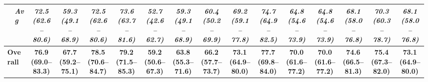 \documentclass[10pt,journal,compsoc, onecolumn]{IEEEtran}
\begin{document}
\begin{table}
\begin{tabular}{ll ccc c ccc ccc ccc c}
\cmidrule{2-16}
& \textit{Avg} & \textit{72.5 (62.6--80.6)} & \textit{59.3 (49.1--68.9)} & \textit{72.5 (62.6--80.6)} & \textit{73.6 (63.7--81.6)} & \textit{52.7 (42.6--62.7)} & \textit{59.3 (49.1--68.9)} & \textit{60.4 (50.2--69.9)} & \textit{69.2 (59.1--77.8)} & \textit{74.7 (64.9--82.5)} & \textit{64.8 (54.6--73.9)} & \textit{64.8 (54.6--73.9)} & \textit{68.1 (58.0--76.8)} & \textit{70.3 (60.3--78.7)} & \textit{68.1 (58.0--76.8)} \\
\midrule
\multicolumn{2}{l}{\textbf{Overall}} & \textbf{76.9 (69.0--83.3)} & \textbf{67.7 (59.2--75.1)} & \textbf{78.5 (70.6--84.7)} & \textbf{79.2 (71.5--85.3)} & \textbf{59.2 (50.6--67.3)} & \textbf{63.8 (55.3--71.6)} & \textbf{66.2 (57.7--73.7)} & \textbf{73.1 (64.9--80.0)} & \textbf{77.7 (69.8--84.0)} & \textbf{70.0 (61.6--77.2)} & \textbf{70.0 (61.6--77.2)} & \textbf{74.6 (66.5--81.3)} & \textbf{75.4 (67.3--82.0)} & \textbf{73.1 (64.9--80.0)} \\
\bottomrule
\end{tabular}
\end{table}
\end{document}
